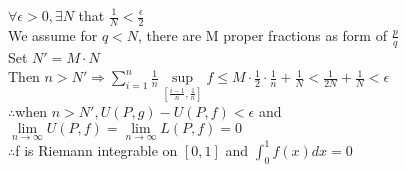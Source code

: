 \documentclass{article}
\begin{document}
$\forall\epsilon>0, \exists N$ that $\displaystyle\frac{1}{N}<\frac{\epsilon}{2}$\\

We assume for $q<N$, there are M proper fractions as form of $\displaystyle\frac{p}{q}$\\

Set $N'=M\cdot N$\\

Then $\displaystyle n>N'\Rightarrow\sum \limits_{i=1}^n\frac{1}{n}\sup \limits_{[\frac{i-1}{n},\frac{1}{n}]}f\leq M\cdot\frac{1}{2}\cdot\frac{1}{n}+\frac{1}{N}<\frac{1}{2N}+\frac{1}{N}<\epsilon$\\

$\therefore$\qquad when $n>N', U(P,g)-U(P,f)<\epsilon$ and $\lim \limits_{n \to \infty}U(P,f)=\lim \limits_{n \to \infty}L(P,f)=0$\\

$\therefore$\qquad f is Riemann integrable on $[0,1]$ and $\int_0^1f(x)dx=0$\\
\end{document}
